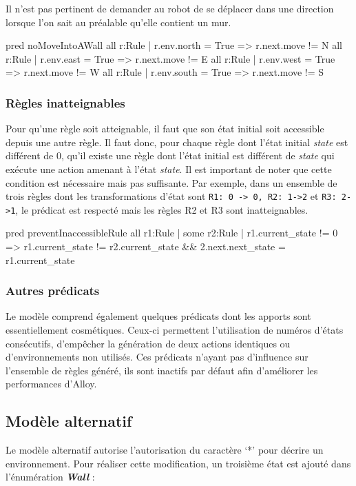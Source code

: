 \documentclass{article}
\begin{document}
\newpage

Il n'est pas pertinent de demander au robot de se déplacer dans une direction lorsque l'on sait au préalable qu'elle contient un mur. 

\begin{alloy}
pred noMoveIntoAWall {
  all r:Rule | r.env.north = True => r.next.move != N
  all r:Rule | r.env.east = True => r.next.move != E
  all r:Rule | r.env.west = True => r.next.move != W
  all r:Rule | r.env.south = True => r.next.move != S
}
\end{alloy}

\subsubsection*{Règles inatteignables}
Pour qu’une règle soit atteignable, il faut que son état initial soit accessible depuis une autre règle. Il faut donc, pour chaque règle dont l’état initial \textit{state} est différent de 0, qu’il existe une règle dont l’état initial est différent de \textit{state} qui exécute une action amenant à l’état \textit{state}. Il est important de noter que cette condition est nécessaire mais pas suffisante. Par exemple, dans un ensemble de trois règles dont les transformations d’état sont \texttt{R1: 0 -> 0, R2: 1->2} et \texttt{R3: 2->1}, le prédicat est respecté mais les règles R2 et R3 sont inatteignables.

\begin{alloy}
pred preventInaccessibleRule {
  all r1:Rule | some r2:Rule | r1.current_state != 0 => r1.current_state != r2.current_state && 2.next.next_state = r1.current_state
}
\end{alloy}

\subsubsection{Autres prédicats}
Le modèle comprend également quelques prédicats dont les apports sont essentiellement cosmétiques. Ceux-ci permettent l'utilisation de numéros d’états consécutifs, d'empêcher la génération de deux actions identiques ou d’environnements non utilisés. Ces prédicats n'ayant pas d'influence sur l'ensemble de règles généré, ils sont inactifs par défaut afin d'améliorer les performances d'Alloy.

\subsection{Modèle alternatif}
Le modèle alternatif autorise l'autorisation du caractère ‘*’ pour décrire un environnement. Pour réaliser cette modification, un troisième état est ajouté dans l’énumération \textit{\textbf{Wall}} :
\end{document}

